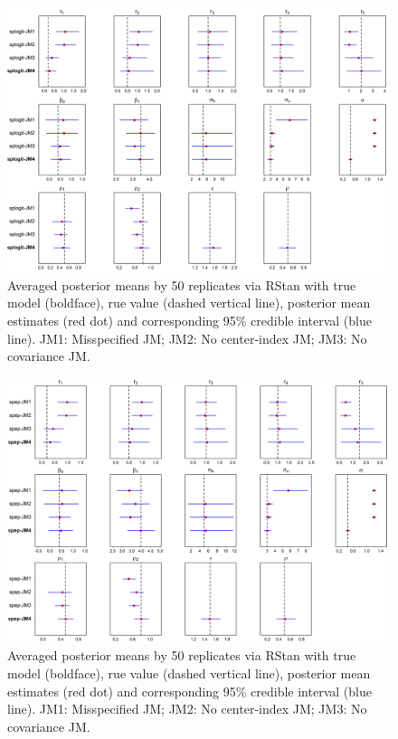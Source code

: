 
\begin{figure}[ht]
\centering
\includegraphics[width=\textwidth]{Figures/Chp2_SIM_SPLOGIT_B.jpg}
\caption{Averaged posterior means by 50 replicates via RStan with true model (boldface),  rue value (dashed vertical line), posterior mean estimates (red dot) and corresponding 95\% credible interval (blue line). JM1: Misspecified JM; JM2: No center-index JM; JM3: No covariance JM. }
\label{fig:chp2_simb1}
\end{figure}


\begin{figure}[ht]
\centering
\includegraphics[width=\textwidth]{Figures/Chp2_SIM_SPEP_B.jpg}
\caption{Averaged posterior means by 50 replicates via RStan with true model (boldface),  rue value (dashed vertical line), posterior mean estimates (red dot) and corresponding 95\% credible interval (blue line). JM1: Misspecified JM; JM2: No center-index JM; JM3: No covariance JM. }
\label{fig:chp2_simb2}
\end{figure}

